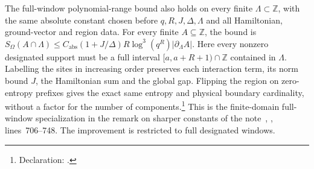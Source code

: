 \documentclass{article}
\begin{document}
The full-window polynomial-range bound also holds on every finite
$\Lambda\subset\mathbb Z$, with the same absolute constant chosen before
$q,R,J,\Delta,\Lambda$ and all Hamiltonian, ground-vector and region data.
For every finite $A\subseteq\mathbb Z$, the bound is
$S_\Omega(A\cap\Lambda)\le C_{\mathrm{abs}}(1+J/\Delta)R\log^3(q^R)|\partial_\Lambda A|$.
Here every nonzero designated support must be a full interval
$[a,a+R+1)\cap\mathbb Z$ contained in $\Lambda$.
Labelling the sites in increasing order preserves each interaction term,
its norm bound $J$, the Hamiltonian sum and the global gap.
Flipping the region on zero-entropy prefixes gives the exact same entropy
and physical boundary cardinality, without a factor for the number of components.\footnote{Declaration:
    .}
This is the finite-domain full-window specialization in the remark on sharper
constants of the note~\cite{TNLean2026OneDimensional},
, lines~706--748.
The improvement is restricted to full designated windows.



\end{document}
